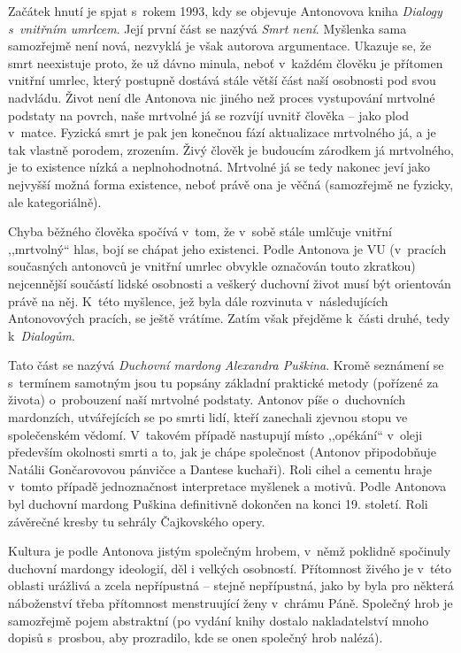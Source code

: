 Začátek hnutí je spjat s~rokem 1993, kdy se objevuje Antonovova kniha \textit{Dialogy s~vnitřním umrlcem}. Její první část se nazývá \textit{Smrt není}. Myšlenka sama samozřejmě není nová, nezvyklá je však autorova argumentace. Ukazuje se, že smrt neexistuje proto, že už dávno minula, neboť v~každém člověku je přítomen vnitřní umrlec, který postupně dostává stále větší část naší osobnosti pod svou nadvládu. Život není dle Antonova nic jiného než proces vystupování mrtvolné podstaty na povrch, naše mrtvolné já se rozvíjí uvnitř člověka -- jako plod v~matce. Fyzická smrt je pak jen konečnou fází aktualizace mrtvolného já, a je tak vlastně porodem, zrozením. Živý člověk je budoucím zárodkem já mrtvolného, je to existence nízká a neplnohodnotná. Mrtvolné já se tedy nakonec jeví jako nejvyšší možná forma existence, neboť právě ona je věčná (samozřejmě ne fyzicky, ale kategoriálně).

Chyba běžného člověka spočívá v~tom, že v~sobě stále umlčuje vnitřní ,,mrtvolný`` hlas, bojí se chápat jeho existenci. Podle Antonova je VU (v~pracích současných antonovců je vnitřní umrlec obvykle označován touto zkratkou) nejcennější součástí lidské osobnosti a veškerý duchovní život musí být orientován právě na něj. K~této myšlence, jež byla dále rozvinuta v~následujících Antonovových pracích, se ještě vrátíme. Zatím však přejděme k~části druhé, tedy k~\textit{Dialogům}.

Tato část se nazývá \textit{Duchovní mardong Alexandra Puškina}. \linebreak Kromě seznámení se s~termínem samotným jsou tu popsány základní praktické metody (pořízené za života) o~probouzení naší mrtvolné podstaty. Antonov píše o~duchovních mardonzích, utvářejících se po smrti lidí, kteří zanechali zjevnou stopu ve společenském vědomí. V~takovém případě nastupují místo ,,opékání`` v~oleji především okolnosti smrti a to, jak je chápe společnost (Antonov připodobňuje Natálii Gončarovovou pánvičce a Dantese kuchaři). Roli cihel a cementu hraje v~tomto případě jednoznačnost interpretace myšlenek a motivů. Podle Antonova byl duchovní mardong Puškina definitivně dokončen na konci 19. století. Roli závěrečné kresby tu sehrály Čajkovského opery.  

Kultura je podle Antonova jistým společným hrobem, v~němž poklidně spočinuly duchovní mardongy ideologií, děl i velkých osobností. Přítomnost živého je v~této oblasti urážlivá a zcela nepřípustná -- stejně nepřípustná, jako by byla pro některá náboženství třeba přítomnost menstruující ženy v~chrámu Páně. Společný hrob je samozřejmě pojem abstraktní (po vydání knihy dostalo nakladatelství mnoho dopisů s~prosbou, aby prozradilo, kde se onen společný hrob nalézá).

